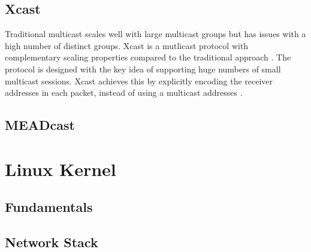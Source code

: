 \subsection{Xcast}
\label{sub:Xcast}
Traditional multicast scales well with large multicast groups but has issues
with a high number of distinct groups.
Xcast is a mutlicast protocol with complementary scaling properties compared to
the traditional approach \cite{xcast_rfc}.
The protocol is designed with the key idea of supporting huge numbers of small
multicast sessions.
Xcast achieves this by explicitly encoding the receiver addresses in each
packet, instead of using a multicast addresses \cite{xcast_rfc}.





\subsection{MEADcast} %
\label{sub:MEADcast}


\section{Linux Kernel} %
\label{sec:Linux Kernel}

\subsection{Fundamentals} %
\label{sub:Fundamentals}


\subsection{Network Stack} %
\label{sub:Network Stack}


